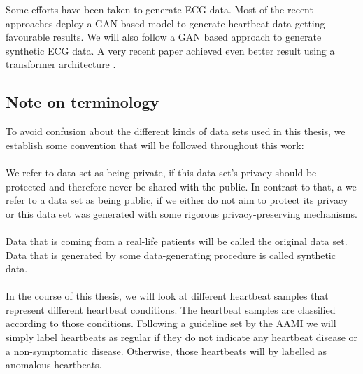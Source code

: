Some efforts have been taken to generate ECG data. Most of the recent approaches deploy a GAN based model to generate heartbeat data \Parencite[see e. g.][]{zhu2019electrocardiogram,Delaney2019SynthesisOR,wang2020accurate} getting favourable results. We will also follow a GAN based approach to generate synthetic ECG data. A very recent paper achieved even better result using a transformer architecture \Parencite[see][]{Kaleli2023GenerationOS}.  

\subsection{Note on terminology}
To avoid confusion about the different kinds of data sets used in this thesis, we establish some convention that will be followed throughout this work:

\paragraph{}
We refer to data set as being private, if this data set's privacy should be protected and therefore never be shared with the public. In contrast to that, a we refer to a data set as being public, if we either do not aim to protect its privacy or this data set was generated with some rigorous privacy-preserving mechanisms.

\paragraph{}
Data that is coming from a real-life patients will be called the original data set. Data that is generated by some data-generating procedure is called synthetic data.

\paragraph{}
In the course of this thesis, we will look at different heartbeat samples that represent different heartbeat conditions. The heartbeat samples are classified according to those conditions. Following a guideline set by the AAMI we will simply label heartbeats as regular if they do not indicate any heartbeat disease or a non-symptomatic disease. Otherwise, those heartbeats will by labelled as anomalous heartbeats.